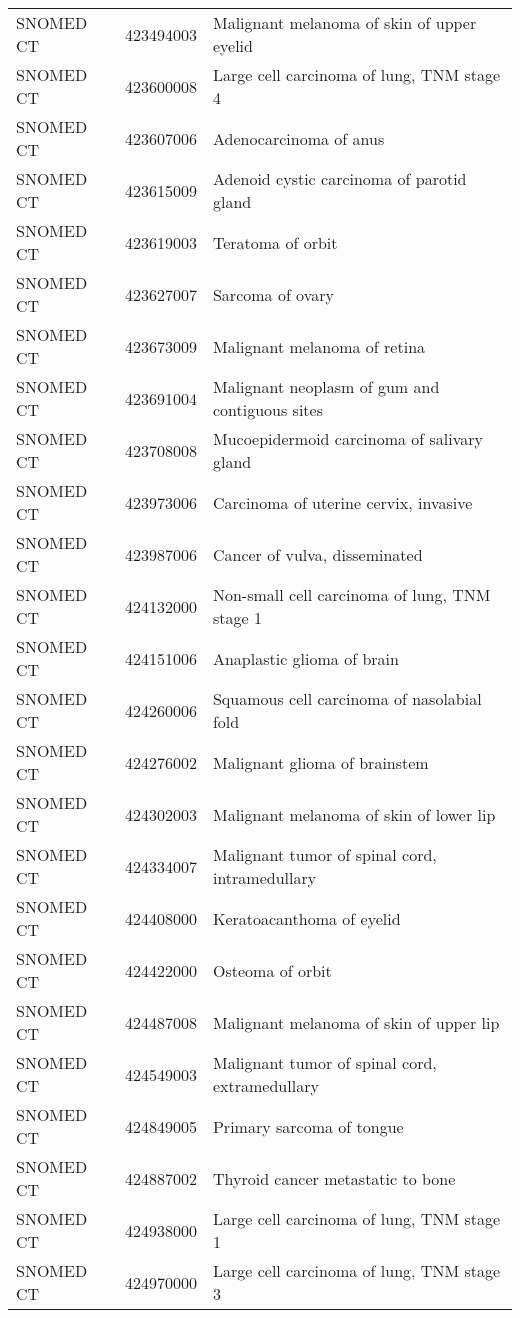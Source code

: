 \begin{longtable}{p{}p{}p{}}
  SNOMED CT & 423494003 & Malignant melanoma of skin of upper eyelid \\ 
  SNOMED CT & 423600008 & Large cell carcinoma of lung, TNM stage 4 \\ 
  SNOMED CT & 423607006 & Adenocarcinoma of anus \\ 
  SNOMED CT & 423615009 & Adenoid cystic carcinoma of parotid gland \\ 
  SNOMED CT & 423619003 & Teratoma of orbit \\ 
  SNOMED CT & 423627007 & Sarcoma of ovary \\ 
  SNOMED CT & 423673009 & Malignant melanoma of retina \\ 
  SNOMED CT & 423691004 & Malignant neoplasm of gum and contiguous sites \\ 
  SNOMED CT & 423708008 & Mucoepidermoid carcinoma of salivary gland \\ 
  SNOMED CT & 423973006 & Carcinoma of uterine cervix, invasive \\ 
  SNOMED CT & 423987006 & Cancer of vulva, disseminated \\ 
  SNOMED CT & 424132000 & Non-small cell carcinoma of lung, TNM stage 1 \\ 
  SNOMED CT & 424151006 & Anaplastic glioma of brain \\ 
  SNOMED CT & 424260006 & Squamous cell carcinoma of nasolabial fold \\ 
  SNOMED CT & 424276002 & Malignant glioma of brainstem \\ 
  SNOMED CT & 424302003 & Malignant melanoma of skin of lower lip \\ 
  SNOMED CT & 424334007 & Malignant tumor of spinal cord, intramedullary \\ 
  SNOMED CT & 424408000 & Keratoacanthoma of eyelid \\ 
  SNOMED CT & 424422000 & Osteoma of orbit \\ 
  SNOMED CT & 424487008 & Malignant melanoma of skin of upper lip \\ 
  SNOMED CT & 424549003 & Malignant tumor of spinal cord, extramedullary \\ 
  SNOMED CT & 424849005 & Primary sarcoma of tongue \\ 
  SNOMED CT & 424887002 & Thyroid cancer metastatic to bone \\ 
  SNOMED CT & 424938000 & Large cell carcinoma of lung, TNM stage 1 \\ 
  SNOMED CT & 424970000 & Large cell carcinoma of lung, TNM stage 3 \\ 

\end{longtable}
